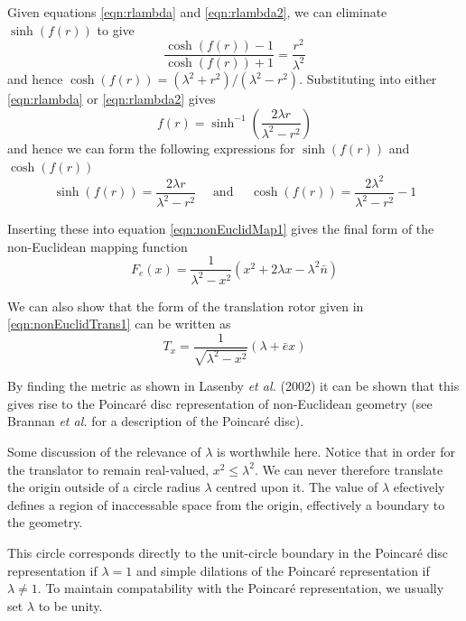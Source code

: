 Given equations \ref{eqn:rlambda} and \ref{eqn:rlambda2}, we can eliminate
$\sinh(f(r))$ to give
\begin{equation}
\frac{\cosh(f(r)) -1}{\cosh(f(r)) + 1} = \frac{r^2}{\lambda^2}
\end{equation}
and hence $\cosh(f(r)) = (\lambda^2 + r^2)/(\lambda^2 - r^2)$. Substituting
into either \ref{eqn:rlambda} or \ref{eqn:rlambda2} gives
\begin{equation}
f(r) = \sinh^{-1}\left( \frac{2\lambda r}{\lambda^2 - r^2} \right)
\end{equation}
and hence we can form the following expressions for 
$\sinh(f(r))$ and $\cosh(f(r))$
\begin{equation}
\sinh(f(r)) = \frac{2\lambda r}{\lambda^2 - r^2} \quad \mbox{ and } \quad
\cosh(f(r)) = \frac{2\lambda^2}{\lambda^2 - r^2} - 1
\end{equation}

Inserting these into equation \ref{eqn:nonEuclidMap1} gives the final form
of the non-Euclidean mapping function
\begin{equation}
F_e(x) = \frac{1}{\lambda^2 - x^2}(x^2 + 2\lambda x - \lambda^2\bar{n})
\label{eqn:nonEuclidMapping}
\end{equation}

We can also show that the form of the translation rotor given in 
\ref{eqn:nonEuclidTrans1} can be written as
\begin{equation}
T_x = \frac{1}{\sqrt{\lambda^2 - x^2}}(\lambda + \bar{e}x)
\end{equation}

By finding the metric as shown in Lasenby \emph{et al.} (2002) it can be shown
that this gives rise to the Poincar\'e disc representation of non-Euclidean
geometry (see Brannan \emph{et al.} \cite{GEOM:brannan} for a description of the 
Poincar\'e disc).

Some discussion of the relevance of $\lambda$ is worthwhile here. Notice that
in order for the translator to remain real-valued, $x^2 \le \lambda^2$. 
We can never therefore translate the origin outside of a circle radius
$\lambda$ centred upon it. The value of $\lambda$ efectively defines
a region of inaccessable space from the origin, effectively a boundary to
the geometry.

This circle corresponds directly to the unit-circle boundary in the
Poincar\'e disc representation if $\lambda = 1$ and simple dilations of
the Poincar\'e representation if $\lambda \ne 1$. To maintain compatability
with the Poincar\'e representation, we usually set $\lambda$ to be unity.

